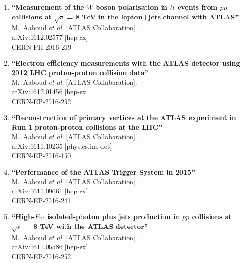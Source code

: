 \documentclass{article}
\begin{document}
\begin{enumerate}
\item%
{\bf ``Measurement of the $W$ boson polarisation in $t\bar{t}$ events from $pp$ collisions at $\sqrt{s}$ = 8 TeV in the lepton+jets channel with ATLAS''}
  \\{}M.~Aaboud {\it et al.} [ATLAS Collaboration].
  \\{}arXiv:1612.02577 [hep-ex]
  \\{}CERN-PH-2016-219

\item%
{\bf ``Electron efficiency measurements with the ATLAS detector using 2012 LHC proton-proton collision data''}
  \\{}M.~Aaboud {\it et al.} [ATLAS Collaboration].
  \\{}arXiv:1612.01456 [hep-ex]
  \\{}CERN-EP-2016-262

\item%
{\bf ``Reconstruction of primary vertices at the ATLAS experiment in Run 1 proton-proton collisions at the LHC''}
  \\{}M.~Aaboud {\it et al.} [ATLAS Collaboration].
  \\{}arXiv:1611.10235 [physics.ins-det]
  \\{}CERN-EP-2016-150

\item%
{\bf ``Performance of the ATLAS Trigger System in 2015''}
  \\{}M.~Aaboud {\it et al.} [ATLAS Collaboration].
  \\{}arXiv:1611.09661 [hep-ex]
  \\{}CERN-EP-2016-241
\item%
{\bf ``High-$E_{\rm T}$ isolated-photon plus jets production in $pp$ collisions at $\sqrt s=$ 8 TeV with the ATLAS detector''}
  \\{}M.~Aaboud {\it et al.} [ATLAS Collaboration].
  \\{}arXiv:1611.06586 [hep-ex]
  \\{}CERN-EP-2016-252


\end{enumerate}
\end{document}
